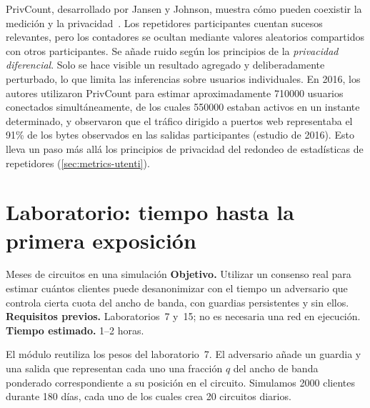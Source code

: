\begin{approfondimento}
PrivCount, desarrollado por Jansen y Johnson, muestra cómo pueden coexistir la medición y la privacidad~\cite{jansen2016privcount}. Los repetidores participantes cuentan sucesos relevantes, pero los contadores se ocultan mediante valores aleatorios compartidos con otros participantes. Se añade ruido según los principios de la \emph{privacidad diferencial}. Solo se hace visible un resultado agregado y deliberadamente perturbado, lo que limita las inferencias sobre usuarios individuales. En 2016, los autores utilizaron PrivCount para estimar aproximadamente \num{710000} usuarios conectados simultáneamente, de los cuales \num{550000} estaban activos en un instante determinado, y observaron que el tráfico dirigido a puertos web representaba el 91\% de los bytes observados en las salidas participantes (estudio de 2016). Esto lleva un paso más allá los principios de privacidad del redondeo de estadísticas de repetidores (\cref{sec:metrics-utenti}).
\end{approfondimento}

\section{Laboratorio: tiempo hasta la primera exposición}\label{sec:lab-ricerca}

\begin{laboratorio}[19]{Meses de circuitos en una simulación}
\textbf{Objetivo.} Utilizar un consenso real para estimar cuántos clientes puede desanonimizar con el tiempo un adversario que controla cierta cuota del ancho de banda, con guardias persistentes y sin ellos.\\
\textbf{Requisitos previos.} Laboratorios~7 y~15; no es necesaria una red en ejecución.\\
\textbf{Tiempo estimado.} 1--2 horas.
\end{laboratorio}

El módulo  reutiliza los pesos del laboratorio~7. El adversario añade un guardia y una salida que representan cada uno una fracción $q$ del ancho de banda ponderado correspondiente a su posición en el circuito. Simulamos \num{2000} clientes durante 180 días, cada uno de los cuales crea 20 circuitos diarios.

